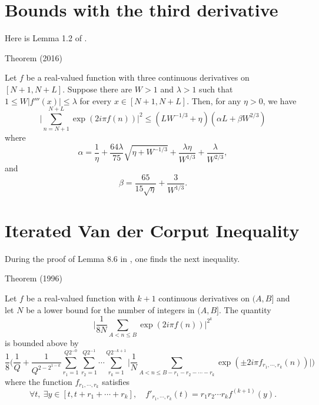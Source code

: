   
\par 
\section{Bounds with the third derivative}


Here is Lemma 1.2 of
\cite{Hiary*16}.
\par 
\begin{thm}{Theorem (2016)}

  Let $f$ be a real-valued function with three continuous derivatives
  on $[N+1, N+L]$. Suppose there are $W > 1$ and $\lambda > 1$ such
  that $1 \le W |f'''(x)| \le \lambda$ for every $x\in [N+1,
  N+L]$. Then, for any $\eta > 0$, we have
  $$
  \biggl|\sum_{n= N+1}^{N+L}
  \exp( 2i\pi f(n)) \biggr|^2
  \le (LW^{-1/3} +\eta) (\alpha L + \beta W^{2/3})
  $$
  where
  $$
  \alpha = \frac{1}{\eta} +\frac{64\lambda}{75}
  \sqrt{\eta + W^{-1/3}}+\frac{\lambda\eta}{W^{1/3}}
  +\frac{\lambda}{W^{2/3}},
  $$
  and
  $$
  \beta = \frac{65}{15\sqrt{\eta}} + \frac{3}{W^{1/3}}.
  $$
\end{thm}


  
\par 
\section{Iterated Van der Corput Inequality}


During the proof of Lemma 8.6 in 
  \cite{Granville-Ramare*96},
  one finds the next inequality.
\par 
\begin{thm}{Theorem (1996)}

  Let $f$ be a real-valued function with $k+1$ continuous derivatives
  on $(A, B]$ and let $N$ be a lower bound for the number of integers
  in $(A,B]$. The quantity
  $$
  \biggl|\frac{1}{8N}
  \sum_{A < n\le B} \exp(2 i \pi f(n))\biggr|^{2^k}
	    $$
	    is bounded above by
	    $$
	    \frac{1}{8}\biggl(
	    \frac{1}{Q} + \frac{1}{Q^{2-2^{1-k}}}
	    \sum_{r_1 =1}^{Q2^{-0}}
	    \sum_{r_2 =1}^{Q2^{-1}}
	    \cdots
	    \sum_{r_k =1}^{Q2^{-k+1}}
	    \biggl|
	    \frac{1}{N}
	    \sum_{A < n \le B-r_1-r_2-\cdots-r_k}
		    \exp(\pm 2i\pi f_{r_1,\cdots,r_k}(n))   
	    \biggr|
	    \biggr)
		      $$
		      where the function $f_{r_1,\cdots,r_k}$ satisfies
		      $$
		      \forall t,\ \exists y\in[t, t + r_1 + \cdots + r_k],
		      \quad
		      f'_{r_1,\cdots, r_k}(t) = r_1r_2\cdots r_k f^{(k+1)}(y).
		      $$
\end{thm}




